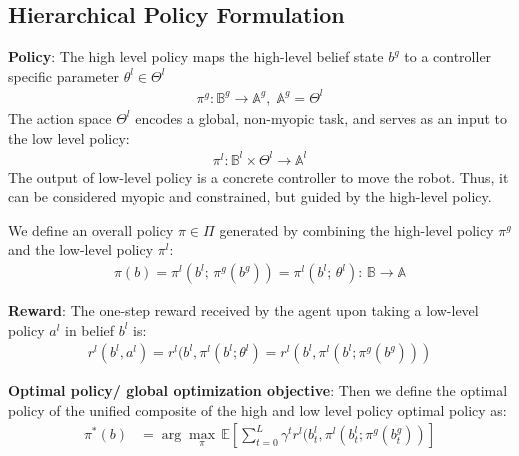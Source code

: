 \documentclass{article}
\newcommand{\ph}[1]{{\textbf{#1}:}} %
\begin{document}
\subsection{Hierarchical Policy Formulation}
\ph{Policy} The high level policy maps the high-level belief state $b^g$ to a controller specific parameter $\theta^l \in \Theta^l$ 
\begin{align}
    \pi^g : \mathbb{B}^g \to \mathbb{A}^g, \; \mathbb{A}^g = \Theta^l
\end{align}
The action space $\Theta^l$ encodes a global, non-myopic task, and serves as an input to the low level policy: 
\begin{align}
    \pi^l: \mathbb{B}^l \times \Theta^l \to \mathbb{A}^l
\end{align}
The output of low-level policy is a concrete controller to move the robot. Thus, it can be considered myopic and constrained, but guided by the high-level policy.

We define an overall policy $\pi \in \Pi$ generated by combining the high-level policy $\pi^g$ and the low-level policy $\pi^l$:
\begin{align}
    \pi(b) = \pi^l(b^l; \, \pi^g(b^g)) = \pi^l(b^l; \, \theta^l) : \, \mathbb{B}\rightarrow \mathbb{A} 
\end{align}

\ph{Reward} The one-step reward received by the agent upon taking a low-level policy $a^l$ in belief $b^l$ is:
\begin{align}
    r^l(b^l, a^l) = r^l(b^l, \pi^l(b^l; \theta^l) = r^l(b^l, \pi^l(b^l; \pi^g(b^g)))
\end{align}

\ph{Optimal policy/ global optimization objective} Then we define the optimal policy of the unified composite of the high and low level policy optimal policy as:
\begin{align}
  \pi^{*}(b) &= \arg\max_\pi \, \mathbb{E} \left[ \sum_{t=0}^{L} \gamma^t r^l(b^l_t, \pi^l(b^l_t; \pi^g(b^g_t)) \right]
  \label{eq:optimal_policy_unified}
\end{align}

\end{document}
